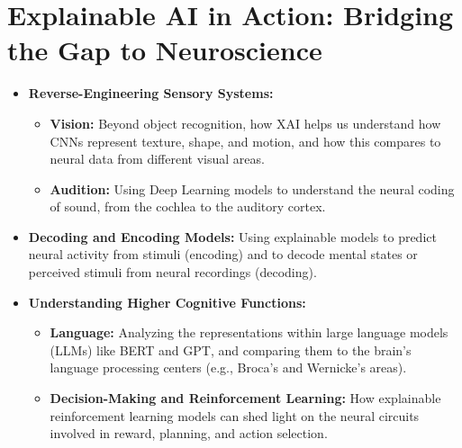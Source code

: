 \section{Explainable AI in Action: Bridging the Gap to Neuroscience}
\begin{itemize}
    \item \textbf{Reverse-Engineering Sensory Systems:}
        \begin{itemize}
            \item \textbf{Vision:} Beyond object recognition, how XAI helps us understand how CNNs represent texture, shape, and motion, and how this compares to neural data from different visual areas.
            \item \textbf{Audition:} Using Deep Learning models to understand the neural coding of sound, from the cochlea to the auditory cortex.
        \end{itemize}
    \item \textbf{Decoding and Encoding Models:} Using explainable models to predict neural activity from stimuli (encoding) and to decode mental states or perceived stimuli from neural recordings (decoding).
    \item \textbf{Understanding Higher Cognitive Functions:}
        \begin{itemize}
            \item \textbf{Language:} Analyzing the representations within large language models (LLMs) like BERT and GPT, and comparing them to the brain's language processing centers (e.g., Broca's and Wernicke's areas).
            \item \textbf{Decision-Making and Reinforcement Learning:} How explainable reinforcement learning models can shed light on the neural circuits involved in reward, planning, and action selection.
        \end{itemize}
\end{itemize}

\clearpage